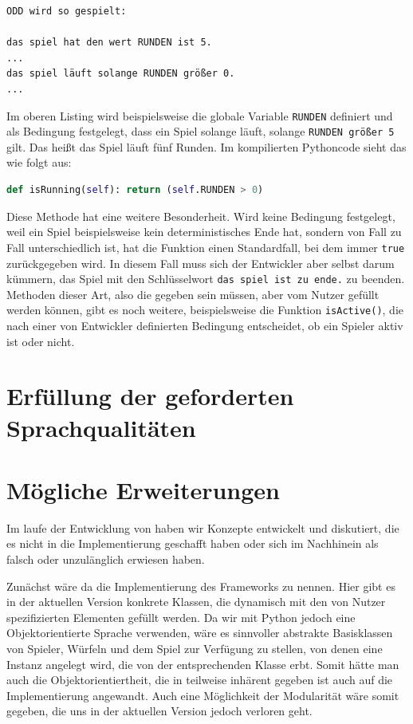 \begin{lstlisting}[label={lst:ODD}]
ODD wird so gespielt:

das spiel hat den wert RUNDEN ist 5.
...
das spiel läuft solange RUNDEN größer 0.
...
\end{lstlisting}
	Im oberen Listing wird beispielsweise die globale Variable \texttt{RUNDEN} definiert und als Bedingung festgelegt, dass ein Spiel solange läuft, solange \texttt{RUNDEN größer 5} gilt. Das heißt das Spiel läuft fünf Runden. Im kompilierten Pythoncode sieht das wie folgt aus:
\begin{lstlisting}[language=Python]
def isRunning(self): return (self.RUNDEN > 0)
\end{lstlisting}
Diese Methode hat eine weitere Besonderheit. Wird keine Bedingung festgelegt, weil ein Spiel beispielsweise kein deterministisches Ende hat, sondern von Fall zu Fall unterschiedlich ist, hat die Funktion einen Standardfall, bei dem immer \texttt{true} zurückgegeben wird. In diesem Fall muss sich der Entwickler aber selbst darum kümmern, das Spiel mit den Schlüsselwort \texttt{das spiel ist zu ende.} zu beenden. Methoden dieser Art, also die gegeben sein müssen, aber vom Nutzer gefüllt werden können, gibt es noch weitere, beispielsweise die Funktion \texttt{isActive()}, die nach einer von Entwickler definierten Bedingung entscheidet, ob ein Spieler aktiv ist oder nicht.


\section{Erfüllung der geforderten Sprachqualitäten} %
\label{sec:erfullung_der_geforderten_sprachqualitaten}


\section{Mögliche Erweiterungen} %
\label{sec:mogliche_erweiterungen}
	Im laufe der Entwicklung von \dg haben wir Konzepte entwickelt und diskutiert, die es nicht in die Implementierung geschafft haben oder sich im Nachhinein als falsch oder unzulänglich erwiesen haben.
	
	Zunächst wäre da die Implementierung des Frameworks zu nennen. Hier gibt es in der aktuellen Version konkrete Klassen, die dynamisch mit den von Nutzer spezifizierten Elementen gefüllt werden. Da wir mit Python jedoch eine Objektorientierte Sprache verwenden, wäre es sinnvoller abstrakte Basisklassen von Spieler, Würfeln und dem Spiel zur Verfügung zu stellen, von denen eine Instanz angelegt wird, die von der entsprechenden Klasse erbt. Somit hätte man auch die Objektorientiertheit, die in \dg teilweise inhärent gegeben ist auch auf die Implementierung angewandt. Auch eine Möglichkeit der Modularität wäre somit gegeben, die uns in der aktuellen Version jedoch verloren geht.
	

